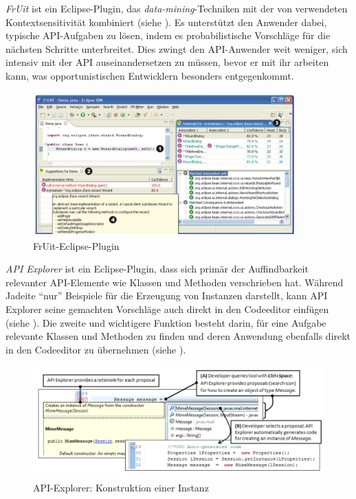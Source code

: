 \textit{FrUit} \citep[\textbf{Fr}amework \textbf{U}nderstand\textbf{i}ng \textbf{T}ool integrated into Eclipse;][]{Bruch:2006bv} ist ein Eclipse-Plugin, das \textit{data-mining}-Techniken mit der von \cite{Holmes:2005cm} verwendeten Kontextsensitivität kombiniert (siehe ). Es unterstützt den Anwender dabei, typische API-Aufgaben zu lösen, indem es probabilistische Vorschläge für die nächsten Schritte unterbreitet. Dies zwingt den API-Anwender weit weniger, sich intensiv mit der API auseinandersetzen zu müssen, bevor er mit ihr arbeiten kann, was opportunistischen Entwicklern besonders entgegenkommt.

\begin{figure}[!ht]
  \centering
    \includegraphics[width=0.9\textwidth]{Figures/tools/fruit.png}
  \caption{FrUit-Eclipse-Plugin \citep{Bruch:2006bv}}
  \label{fig:fruit}
\end{figure}


\textit{API Explorer} \citep{DualaEkoko:2011th} ist ein Eclipse-Plugin, dass sich primär der Auffindbarkeit relevanter API-Elemente wie Klassen und Methoden verschrieben hat. Während Jadeite \citep{Stylos:2009gc} ``nur'' Beispiele für die Erzeugung von Instanzen darstellt, kann API Explorer seine gemachten Vorschläge auch direkt in den Codeeditor einfügen (siehe ). Die zweite und wichtigere Funktion besteht darin, für eine Aufgabe relevante Klassen und Methoden zu finden und deren Anwendung ebenfalls direkt in den Codeeditor zu übernehmen (siehe ).

\begin{figure}[!ht]
  \centering
    \includegraphics[width=1.0\textwidth]{Figures/tools/apiexplorer1.png}
  \caption{API-Explorer: Konstruktion einer Instanz \citep{DualaEkoko:2011th}}
  \label{fig:apiexplorer1}
\end{figure}

